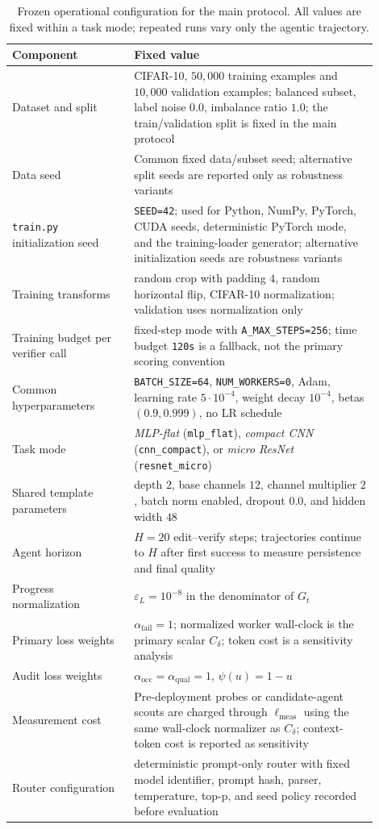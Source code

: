 \documentclass{article}
\newcommand{\eps}{\varepsilon}
\begin{document}
\begin{table}[t]
\centering
\small
\caption{Frozen operational configuration for the main protocol.
All values are fixed within a task mode; repeated runs vary only the agentic trajectory.}
\label{tab:train-config}
\begin{tabular}{@{}p{0.30\linewidth}p{0.60\linewidth}@{}}
\toprule
Component & Fixed value \\
\midrule
Dataset and split & CIFAR-10, $50{,}000$ training examples and $10{,}000$ validation examples; balanced subset, label noise $0.0$, imbalance ratio $1.0$; the train/validation split is fixed in the main protocol \\
Data seed & Common fixed data/subset seed; alternative split seeds are reported only as robustness variants \\
\texttt{train.py} initialization seed & \texttt{SEED=42}; used for Python, NumPy, PyTorch, CUDA seeds, deterministic PyTorch mode, and the training-loader generator; alternative initialization seeds are robustness variants \\
Training transforms & random crop with padding $4$, random horizontal flip, CIFAR-10 normalization; validation uses normalization only \\
Training budget per verifier call & fixed-step mode with \texttt{A\_MAX\_STEPS=256}; time budget \texttt{120s} is a fallback, not the primary scoring convention \\
Common hyperparameters & \texttt{BATCH\_SIZE=64}, \texttt{NUM\_WORKERS=0}, Adam, learning rate $5\cdot 10^{-4}$, weight decay $10^{-4}$, betas $(0.9,0.999)$, no LR schedule \\
Task mode & \textit{MLP-flat} (\texttt{mlp\_flat}), \textit{compact CNN} (\texttt{cnn\_compact}), or \textit{micro ResNet} (\texttt{resnet\_micro}) \\
Shared template parameters & depth $2$, base channels $12$, channel multiplier $2$, batch norm enabled, dropout $0.0$, and hidden width $48$ \\
Agent horizon & $H=20$ edit--verify steps; trajectories continue to $H$ after first success to measure persistence and final quality \\
Progress normalization & $\eps_L=10^{-8}$ in the denominator of $G_t$ \\
Primary loss weights & $\alpha_{\mathrm{fail}}=1$; normalized worker wall-clock is the primary scalar $C_\delta$; token cost is a sensitivity analysis \\
Audit loss weights & $\alpha_{\mathrm{occ}}=\alpha_{\mathrm{qual}}=1$, $\psi(u)=1-u$ \\
Measurement cost & Pre-deployment probes or candidate-agent scouts are charged through $\ell_{\mathrm{meas}}$ using the same wall-clock normalizer as $C_\delta$; context-token cost is reported as sensitivity \\
Router configuration & deterministic prompt-only router with fixed model identifier, prompt hash, parser, temperature, top-p, and seed policy recorded before evaluation \\
\bottomrule
\end{tabular}
\end{table}
\end{document}
